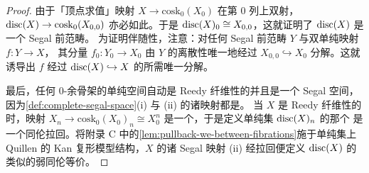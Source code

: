 \begin{proof}
由于「顶点求值」映射 $X\to\mathrm{cosk}_{0}(X_{0})$ 在第 $0$ 列上双射，%
\trPullback{} $\mathrm{disc}(X)\to\mathrm{cosk}_{0}(X_{0,0})$ 亦必如此。于是
$\mathrm{disc}(X)_{0}\cong X_{0,0}$，这就证明了 $\mathrm{disc}(X)$ 是一个 Segal 前范畴。
为证明伴随性，注意：对任何 Segal 前范畴 $Y$ 与双单纯映射 $f\colon Y\to X$，
其分量 $f_{0}\colon Y_{0}\to X_{0}$ 由 $Y$ 的离散性唯一地经过
$X_{0,0}\hookrightarrow X_{0}$ 分解。这就诱导出 $f$ 经过 $\mathrm{disc}(X)\hookrightarrow X$ 的所需唯一分解。

最后，任何 $0$-余骨架的单纯空间自动是 Reedy 纤维性的并且是一个 Segal 空间，
因为\cref{def:complete-segal-space}(i) 与 (ii) 的诸映射都是\trIsomorphism。
当 $X$ 是 Reedy 纤维性的时，映射 $X_{n}\to\mathrm{cosk}_{0}(X_{0})_{n}\cong X_{0}^{n}$ 是一个\trKanFibration，于是定义单纯集 $\mathrm{disc}(X)_{n}$ 的那个%
\trPullback{}是一个同伦拉回。将附录 C 中的\cref{lem:pullback-we-between-fibrations}施于单纯集上 Quillen 的 Kan 复形模型结构，$X$ 的诸 Segal 映射
(ii) 经拉回便定义 $\mathrm{disc}(X)$ 的类似的弱同伦等价。
\end{proof}

